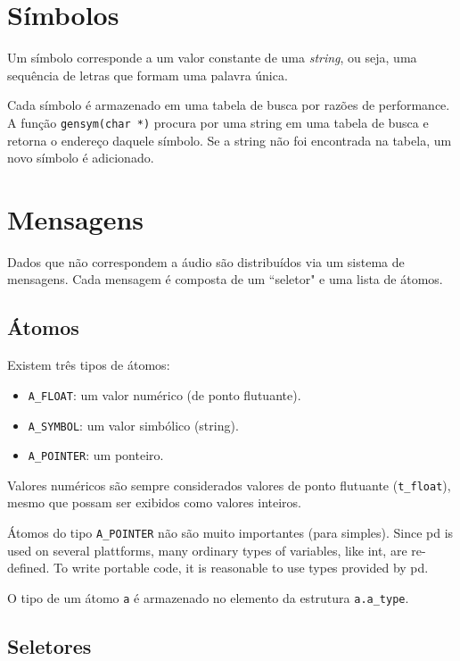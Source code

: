 \section{Símbolos}

Um símbolo corresponde a um valor constante de uma \emph{string}, ou seja,
uma sequência de letras que formam uma palavra única.

Cada símbolo é armazenado em uma tabela de busca por razões de performance. A
função \texttt{gensym(char *)} procura por uma string em uma tabela de busca e
retorna o endereço daquele símbolo. Se a string não foi encontrada na tabela,
um novo símbolo é adicionado.

\section{Mensagens}

Dados que não correspondem a áudio são distribuídos via um sistema de
mensagens. Cada mensagem é composta de um ``seletor" e uma lista de átomos.

\subsection{Átomos}

Existem três tipos de átomos:

\begin{itemize}
\item \texttt{A\_FLOAT}: um valor numérico (de ponto flutuante).
\item \texttt{A\_SYMBOL}: um valor simbólico (string).
\item \texttt{A\_POINTER}: um ponteiro.
\end{itemize}

Valores numéricos são sempre considerados valores de ponto flutuante
(\texttt{t\_float}), mesmo que possam ser exibidos como valores inteiros.

Átomos do tipo \texttt{A\_POINTER} não são muito importantes (para \externals
simples).
Since pd is used on several plattforms, many ordinary types of variables, like int, are re-defined. To write portable code, it is reasonable to use types provided by pd.

O tipo de um átomo \texttt{a} é armazenado no elemento da estrutura
\texttt{a.a\_type}.

\subsection{Seletores}

